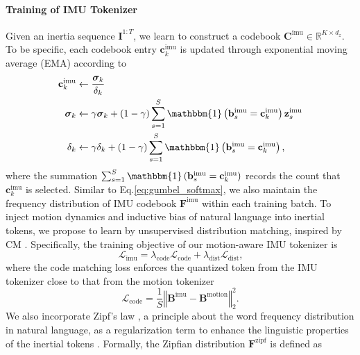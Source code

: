 \vspace{-4mm}
\paragraph{Training of IMU Tokenizer} Given an inertia sequence $\mathbf{I}^{1:T}$, we learn to construct a codebook $\mathbf{C}^{\text{imu}} \in \mathbb{R}^{K\times d_z}$. To be specific, each codebook entry $\mathbf{c}_k^{\text{imu}}$ is updated through exponential moving average (EMA) according to \cite{razavi2019generating}
\begin{align}
    \mathbf{c}_k^{\textrm{imu}} &\leftarrow \frac{\bm{\sigma}_k}{\delta_k} \notag\\
    \bm{\sigma}_k &\leftarrow \gamma\bm{\sigma}_k + \left(1-\gamma\right)\sum_{s=1}^S
    \mathbbm{1}\left(\mathbf{b}_s^{\textrm{imu}}=\mathbf{c}_k^{\textrm{imu}}\right)\mathbf{z}_s^{\textrm{imu}} \notag\\
    \delta_k &\leftarrow \gamma\delta_k + \left(1-\gamma\right)\sum_{s=1}^S\mathbbm{1}\left(\mathbf{b}_s^{\textrm{imu}}=\mathbf{c}_k^{\textrm{imu}}\right)\text{,}
\label{eq:codebook_update}
\end{align}
where the summation $\sum_{s=1}^S\mathbbm{1}\left(\mathbf{b}_s^{\textrm{imu}}=\mathbf{c}_k^{\textrm{imu}}\right)$ records the count that $\mathbf{c}_k^{\textrm{imu}}$ is selected. Similar to Eq.\ref{eq:gumbel_softmax}, we also maintain the frequency distribution of IMU codebook $\mathbf{F}^{\text{imu}}$ within each training batch. To inject motion dynamics and inductive bias of natural language into inertial tokens, we propose to learn by unsupervised distribution matching, inspired by CM \cite{starke2024categorical}. Specifically, the training objective of our motion-aware IMU tokenizer is
\begin{equation}
    \mathcal{L}_{\text{imu}} = \lambda_{\text{code}}\mathcal{L}_{\text{code}} + \lambda_{\text{dist}}\mathcal{L}_{\text{dist}}\text{,}
\label{eq:loss_imu_tokenizer}
\end{equation}
where the code matching loss enforces the quantized token from the IMU tokenizer close to that from the motion tokenizer
\begin{equation}
    \mathcal L_{\text{code}} = \frac{1}{S}\left\Vert \mathbf{B}^{\text{imu}}-\mathbf{B}^{\text{motion}}\right\Vert_2^2\text{.}
\label{eq:token_match_mse}
\end{equation}
We also incorporate Zipf's law \cite{zipf2013psycho,piantadosi2014zipf}, a principle about the word frequency distribution in natural language, as a regularization term to enhance the linguistic properties of the inertial tokens \cite{qu2024llms,papadimitriou2023pretrain}. Formally, the Zipfian distribution $\mathbf{F}^{\text{zipf}}$ is defined as
